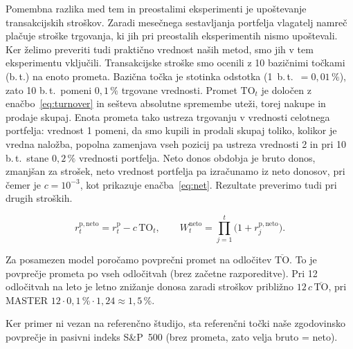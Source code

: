 \documentclass[9pt]{style/friteza}
\begin{document}
Pomembna razlika med tem in preostalimi eksperimenti je upoštevanje transakcijskih stroškov. Zaradi mesečnega sestavljanja portfelja vlagatelj namreč plačuje stroške trgovanja, ki jih pri preostalih eksperimentih nismo upoštevali. Ker želimo preveriti tudi praktično vrednost naših metod, smo jih v tem eksperimentu vključili. Transakcijske stroške smo ocenili z 10 bazičnimi točkami (b.\,t.) na enoto prometa. Bazična točka je stotinka odstotka (1~b.\,t.\ $=0{,}01\,\%$), zato 10 b.\,t.\ pomeni $0{,}1\,\%$ trgovane vrednosti. Promet $\mathrm{TO}_t$ je določen z enačbo~\eqref{eq:turnover} in sešteva absolutne spremembe uteži, torej nakupe in prodaje skupaj. Enota prometa tako ustreza trgovanju v vrednosti celotnega portfelja: vrednost 1 pomeni, da smo kupili in prodali skupaj toliko, kolikor je vredna naložba, popolna zamenjava vseh pozicij pa ustreza vrednosti 2 in pri 10 b.\,t.\ stane $0{,}2\,\%$ vrednosti portfelja. Neto donos obdobja je bruto donos, zmanjšan za strošek, neto vrednost portfelja pa izračunamo iz neto donosov, pri čemer je $c=10^{-3}$, kot prikazuje enačba~\eqref{eq:net}. Rezultate preverimo tudi pri drugih stroških.

\begin{equation}
\label{eq:net}
r^{\mathrm{p,neto}}_t=r^{\mathrm p}_t-c\,\mathrm{TO}_t,
\qquad
W^{\mathrm{neto}}_t=\prod_{j=1}^{t}\bigl(1+r^{\mathrm{p,neto}}_j\bigr).
\end{equation}

Za posamezen model poročamo povprečni promet na odločitev $\overline{\mathrm{TO}}$. To je povprečje prometa po vseh odločitvah (brez začetne razporeditve). Pri 12 odločitvah na leto je letno znižanje donosa zaradi stroškov približno $12\,c\,\overline{\mathrm{TO}}$, pri MASTER $12\cdot 0{,}1\,\%\cdot 1{,}24\approx 1{,}5\,\%$.

Ker primer ni vezan na referenčno študijo, sta referenčni točki naše zgodovinsko povprečje in pasivni indeks S\&P~500 (brez prometa, zato velja bruto = neto). 
\end{document}
